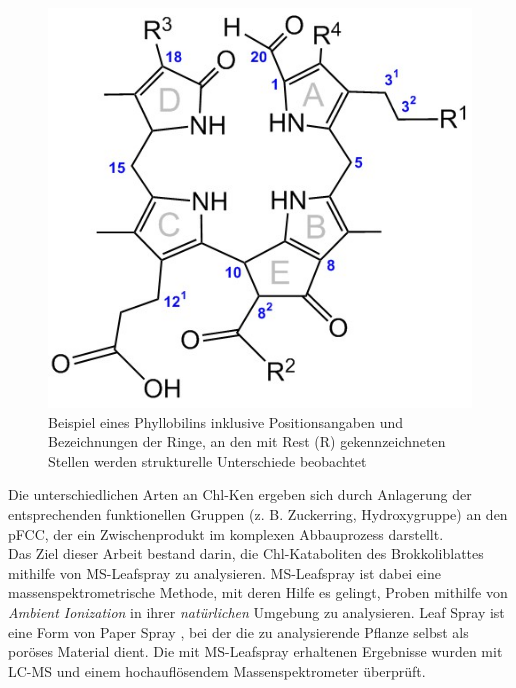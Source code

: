 \documentclass[12pt,a4paper]{article}
\begin{document}
\begin{figure}[!hbtp]
  \centering
  \includegraphics[scale=0.5]{figures/Kapitel2/VWA_Chl-Nummerierung.png}
  \caption[Nummerierung von Phyllobilinen, Quelle: Autor]{Beispiel eines Phyllobilins inklusive Positionsangaben und Bezeichnungen der Ringe, an den mit Rest (R) gekennzeichneten Stellen werden strukturelle Unterschiede beobachtet}
  \label{fig:NummerierungPhyllobiline}
\end{figure}

Die unterschiedlichen Arten an \gls{Chl-K}en ergeben sich durch Anlagerung der entsprechenden funktionellen Gruppen (z. B. Zuckerring, Hydroxygruppe) an den pFCC, der ein Zwischenprodukt im komplexen Abbauprozess darstellt. \cite{ChlorophyllCatabolites} \\

Das Ziel dieser Arbeit bestand darin, die Chl-Kataboliten des Brokkoliblattes mithilfe von MS-Leafspray zu analysieren. MS-Leafspray ist dabei eine massenspektrometrische Methode, mit deren Hilfe es gelingt, Proben mithilfe von \textit{Ambient Ionization} \cite{AmbientIonisation} in ihrer \textit{natürlichen} Umgebung zu analysieren. Leaf Spray ist eine Form von Paper Spray \cite{PaperSpray}, bei der die zu analysierende Pflanze selbst als poröses Material dient. Die mit MS-Leafspray erhaltenen Ergebnisse wurden mit LC-MS und einem hochauflösendem Massenspektrometer überprüft.

\pagebreak
\end{document}
